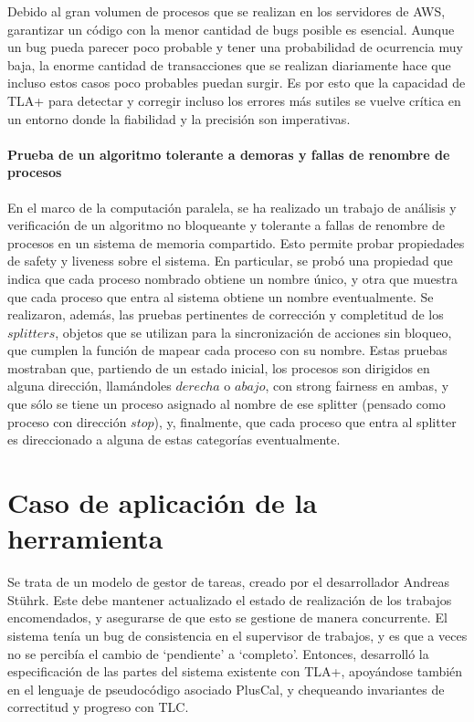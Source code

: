 \documentclass[runningheads]{llncs}
\begin{document}
Debido al gran volumen de procesos que se realizan en los servidores de AWS, garantizar un código con la menor cantidad de bugs posible es esencial. Aunque un bug pueda parecer poco probable y tener una probabilidad de ocurrencia muy baja, la enorme cantidad de transacciones que se realizan diariamente hace que incluso estos casos poco probables puedan surgir. Es por esto que la capacidad de TLA+ para detectar y corregir incluso los errores más sutiles se vuelve crítica en un entorno donde la fiabilidad y la precisión son imperativas.\cite{amazon}

\paragraph{Prueba de un algoritmo tolerante a demoras y fallas de renombre de procesos}
En el marco de la computación paralela, se ha realizado un trabajo de análisis y verificación de un algoritmo no bloqueante y tolerante a fallas de renombre de procesos en un sistema de memoria compartido. Esto permite probar propiedades de safety y liveness sobre el sistema. En particular, se probó una propiedad que indica que cada proceso nombrado obtiene un nombre único, y otra que muestra que cada proceso que entra al sistema obtiene un nombre eventualmente. Se realizaron, además, las pruebas pertinentes de corrección y completitud de los $splitters$, objetos que se utilizan para la sincronización de acciones sin bloqueo, que cumplen la función de mapear cada proceso con su nombre. Estas pruebas mostraban que, partiendo de un estado inicial, los procesos son dirigidos en alguna dirección, llamándoles $derecha$ o $abajo$, con strong fairness en ambas, y que sólo se tiene un proceso asignado al nombre de ese splitter (pensado como proceso con dirección $stop$), y, finalmente, que cada proceso que entra al splitter es direccionado a alguna de estas categorías eventualmente.

\section{Caso de aplicación de la herramienta}
Se trata de un modelo de gestor de tareas, creado por el desarrollador Andreas Stührk. Este debe mantener actualizado el estado de realización de los trabajos encomendados, y asegurarse de que esto se gestione de manera concurrente. El sistema tenía un bug de consistencia en el supervisor de trabajos, y es que a veces no se percibía el cambio de ‘pendiente’ a ‘completo’. Entonces, desarrolló la especificación de las partes del sistema existente con TLA+, apoyándose también en el lenguaje de pseudocódigo asociado PlusCal, y chequeando invariantes de correctitud y progreso con TLC.
\end{document}
